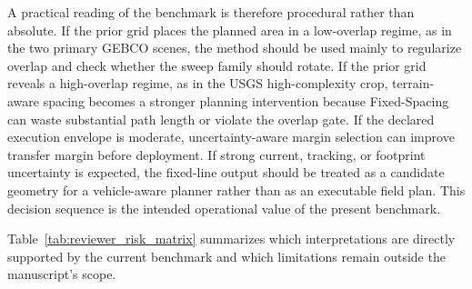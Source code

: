 \documentclass[jmse,article,submit,moreauthors]{Definitions/mdpi}
\begin{document}
A practical reading of the benchmark is therefore procedural rather than absolute. If the prior grid places the planned area in a low-overlap regime, as in the two primary GEBCO scenes, the method should be used mainly to regularize overlap and check whether the sweep family should rotate. If the prior grid reveals a high-overlap regime, as in the USGS high-complexity crop, terrain-aware spacing becomes a stronger planning intervention because Fixed-Spacing can waste substantial path length or violate the overlap gate. If the declared execution envelope is moderate, uncertainty-aware margin selection can improve transfer margin before deployment. If strong current, tracking, or footprint uncertainty is expected, the fixed-line output should be treated as a candidate geometry for a vehicle-aware planner rather than as an executable field plan. This decision sequence is the intended operational value of the present benchmark.

Table~\ref{tab:reviewer_risk_matrix} summarizes which interpretations are directly supported by the current benchmark and which limitations remain outside the manuscript's scope.
\end{document}
